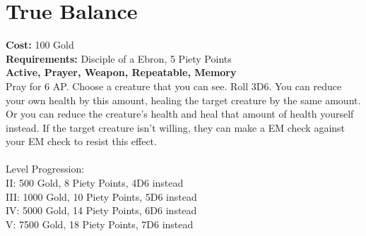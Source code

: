 \section*{True Balance}
\textbf{Cost:} 100 Gold\\
\textbf{Requirements:} Disciple of a Ebron, 5 Piety Points \\
\textbf{Active, Prayer, Weapon, Repeatable, Memory}\\
Pray for 6 AP. Choose a creature that you can see. Roll 3D6. You can reduce your own health by this amount, healing the target creature by the same amount. Or you can reduce the creature's health and heal that amount of health yourself instead. If the target creature isn't willing, they can make a EM check against your EM check to resist this effect.\\
\\
Level Progression:\\
II: 500 Gold, 8 Piety Points, 4D6 instead\\
III: 1000 Gold, 10 Piety Points, 5D6 instead\\
IV: 5000 Gold, 14 Piety Points, 6D6 instead\\
V: 7500 Gold, 18 Piety Points, 7D6 instead\\